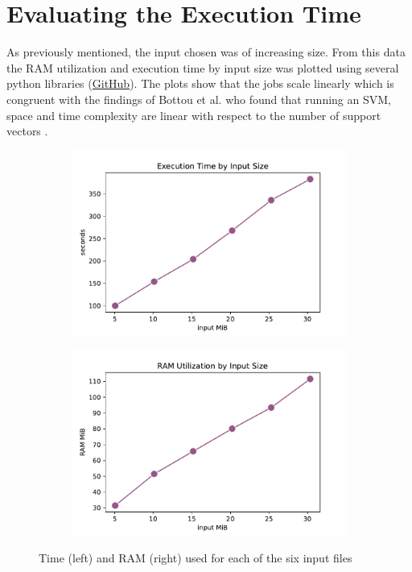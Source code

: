\documentclass{article}
\begin{document}
\section{Evaluating the Execution Time}
As previously mentioned, the input chosen was of increasing size. From this data the RAM utilization and execution time by input size was plotted using several python libraries (\href{https://github.com/ilante/BDP-projcect-aws-main/blob/main/stats/HTcondor_stats.ipynb}{GitHub}). 
The plots show that the jobs scale linearly which is congruent with the findings of Bottou et al. who found that running an SVM, space and time complexity are linear with respect to the number of support vectors \cite{Bottou2007SupportVM}.
\begin{figure}[h]

\begin{subfigure}{0.5\textwidth}
\includegraphics[width=0.9\linewidth]{img/stats/execution_by_input_size.pdf} %
\label{fig:subtime1}
\end{subfigure}
\begin{subfigure}{0.5\textwidth}
\includegraphics[width=0.9\linewidth]{img/stats/ram_utilization_jobs.pdf} %
\label{fig:subram2}
\end{subfigure}

\caption{Time (left) and RAM (right) used for each of the six input files}
\label{fig:image2}
\end{figure}
\end{document}
